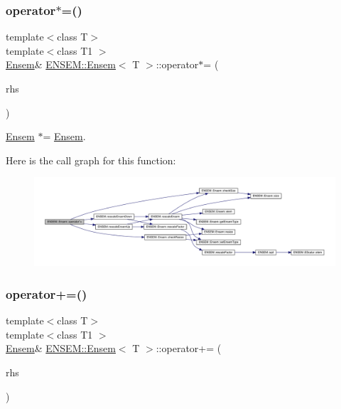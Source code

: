 \subsubsection{\texorpdfstring{operator$\ast$=()}{operator*=()}\hspace{0.1cm}{\footnotesize\ttfamily [6/6]}}
{\footnotesize\ttfamily template$<$class T$>$ \\
template$<$class T1 $>$ \\
\mbox{\hyperlink{classENSEM_1_1Ensem}{Ensem}}\& \mbox{\hyperlink{classENSEM_1_1Ensem}{E\+N\+S\+E\+M\+::\+Ensem}}$<$ T $>$\+::operator$\ast$= (\begin{DoxyParamCaption}\item[{const \mbox{\hyperlink{classENSEM_1_1Ensem}{Ensem}}$<$ T1 $>$ \&}]{rhs }\end{DoxyParamCaption})\hspace{0.3cm}{\ttfamily [inline]}}



\mbox{\hyperlink{classENSEM_1_1Ensem}{Ensem}} $\ast$= \mbox{\hyperlink{classENSEM_1_1Ensem}{Ensem}}. 

Here is the call graph for this function\+:
\nopagebreak
\begin{figure}[H]
\begin{center}
\leavevmode
\includegraphics[width=350pt]{d7/d3e/classENSEM_1_1Ensem_ae6590e101b18547ec3d2682ecbea0371_cgraph}
\end{center}
\end{figure}
\mbox{\label{classENSEM_1_1Ensem_a3b36653814508e90b22543a3f1b465d5}} 
\subsubsection{\texorpdfstring{operator+=()}{operator+=()}\hspace{0.1cm}{\footnotesize\ttfamily [1/6]}}
{\footnotesize\ttfamily template$<$class T$>$ \\
template$<$class T1 $>$ \\
\mbox{\hyperlink{classENSEM_1_1Ensem}{Ensem}}\& \mbox{\hyperlink{classENSEM_1_1Ensem}{E\+N\+S\+E\+M\+::\+Ensem}}$<$ T $>$\+::operator+= (\begin{DoxyParamCaption}\item[{const \mbox{\hyperlink{classENSEM_1_1EScalar}{E\+Scalar}}$<$ T1 $>$ \&}]{rhs }\end{DoxyParamCaption})\hspace{0.3cm}{\ttfamily [inline]}}



